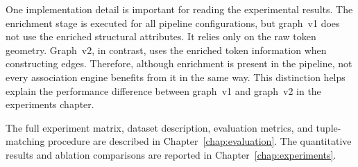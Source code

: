 One implementation detail is important for reading the experimental results. The enrichment stage is executed for all pipeline configurations, but graph~v1 does not use the enriched structural attributes. It relies only on the raw token geometry. Graph~v2, in contrast, uses the enriched token information when constructing edges. Therefore, although enrichment is present in the pipeline, not every association engine benefits from it in the same way. This distinction helps explain the performance difference between graph~v1 and graph~v2 in the experiments chapter.

The full experiment matrix, dataset description, evaluation metrics, and tuple-matching procedure are described in Chapter~\ref{chap:evaluation}. The quantitative results and ablation comparisons are reported in Chapter~\ref{chap:experiments}.

